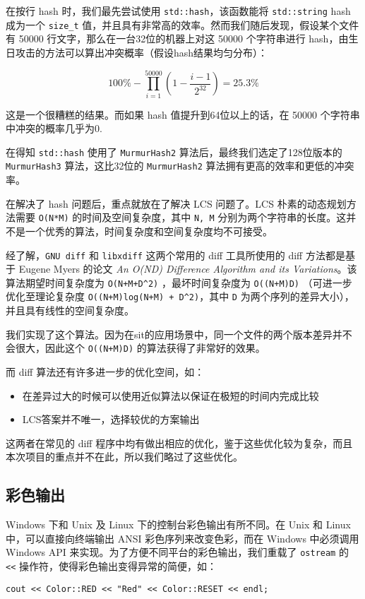 在按行 hash 时，我们最先尝试使用 \texttt{std::hash}，该函数能将
\texttt{std::string} hash 成为一个 \texttt{size\_t}
值，并且具有非常高的效率。然而我们随后发现，假设某个文件有 50000
行文字，那么在一台32位的机器上对这 50000 个字符串进行
hash，由生日攻击的方法可以算出冲突概率（假设hash结果均匀分布）：

\[
100\%-\prod _{i=1}^{50000} \left(1-\frac{i-1}{2^{32}}\right) = 25.3 \%
\]

这是一个很糟糕的结果。而如果 hash 值提升到64位以上的话，在 50000
个字符串中冲突的概率几乎为0.

在得知 \texttt{std::hash} 使用了 \texttt{MurmurHash2}
算法后，最终我们选定了128位版本的 \texttt{MurmurHash3} 算法，这比32位的
\texttt{MurmurHash2} 算法拥有更高的效率和更低的冲突率。

在解决了 hash 问题后，重点就放在了解决 LCS 问题了。LCS
朴素的动态规划方法需要 \texttt{O(N*M)} 的时间及空间复杂度，其中
\texttt{N,\ M}
分别为两个字符串的长度。这并不是一个优秀的算法，时间复杂度和空间复杂度均不可接受。

经了解，\texttt{GNU\ diff} 和 \texttt{libxdiff} 这两个常用的 diff
工具所使用的 diff 方法都是基于 Eugene Myers 的论文 \emph{An O(ND)
Difference Algorithm and its Variations}。该算法期望时间复杂度为
\texttt{O(N+M+D\^{}2)} ，最坏时间复杂度为 \texttt{O((N+M)D)}
（可进一步优化至理论复杂度 \texttt{O((N+M)log(N+M)\ +\ D\^{}2)}，其中
\texttt{D} 为两个序列的差异大小），并且具有线性的空间复杂度。

我们实现了这个算法。因为在sit的应用场景中，同一个文件的两个版本差异并不会很大，因此这个
\texttt{O((N+M)D)} 的算法获得了非常好的效果。

而 diff 算法还有许多进一步的优化空间，如：

\begin{itemize}
\itemsep1pt\parskip0pt
\item
  在差异过大的时候可以使用近似算法以保证在极短的时间内完成比较
\item
  LCS答案并不唯一，选择较优的方案输出
\end{itemize}

这两者在常见的 diff
程序中均有做出相应的优化，鉴于这些优化较为复杂，而且本次项目的重点并不在此，所以我们略过了这些优化。

\subsection{彩色输出}\label{ux5f69ux8272ux8f93ux51fa}

Windows 下和 Unix 及 Linux 下的控制台彩色输出有所不同。在 Unix 和 Linux
中，可以直接向终端输出 ANSI 彩色序列来改变色彩，而在 Windows 中必须调用
Windows API 来实现。为了方便不同平台的彩色输出，我们重载了
\texttt{ostream} 的 \texttt{\textless{}\textless{}}
操作符，使得彩色输出变得异常的简便，如：

\begin{verbatim}
cout << Color::RED << "Red" << Color::RESET << endl;
\end{verbatim}
